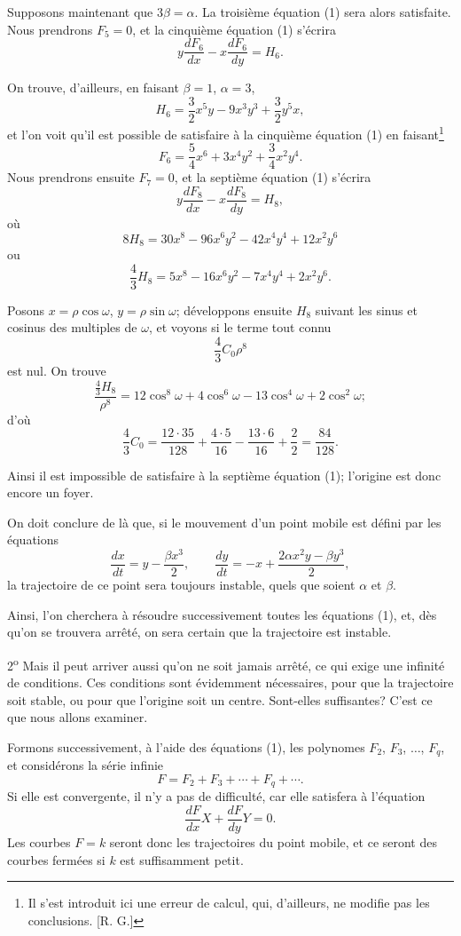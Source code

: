 \documentclass[11pt]{article}
\begin{document}
Supposons maintenant que $3\beta=\alpha$. La troisième équation (1) sera alors satisfaite. Nous prendrons $F_5=0$, et la cinquième équation (1) s’écrira
\[
y\frac{dF_6}{dx}-x\frac{dF_6}{dy}=H_6.
\]

On trouve, d’ailleurs, en faisant $\beta=1$, $\alpha=3$,
\[
H_6=\frac{3}{2}x^5y-9x^3y^3+\frac{3}{2}y^5x,
\]
et l’on voit qu’il est possible de satisfaire à la cinquième équation (1) en faisant\footnote{Il s’est introduit ici une erreur de calcul, qui, d’ailleurs, ne modifie pas les conclusions. [R. G.]}
\[
F_6=\frac{5}{4}x^6+3x^4y^2+\frac{3}{4}x^2y^4.
\]
Nous prendrons ensuite $F_7=0$, et la septième équation (1) s’écrira
\[
y\frac{dF_8}{dx}-x\frac{dF_8}{dy}=H_8,
\]
où
\[
8H_8=30x^8-96x^6y^2-42x^4y^4+12x^2y^6
\]
ou
\[
\frac{4}{3}H_8=5x^8-16x^6y^2-7x^4y^4+2x^2y^6.
\]

Posons $x=\rho\cos\omega$, $y=\rho\sin\omega$; développons ensuite $H_8$ suivant les sinus et cosinus des multiples de $\omega$, et voyons si le terme tout connu
\[
\frac{4}{3}C_0\rho^8
\]
est nul. On trouve
\[
\frac{\frac{4}{3}H_8}{\rho^8}=12\cos^8\omega+4\cos^6\omega-13\cos^4\omega+2\cos^2\omega;
\]
d’où
\[
\frac{4}{3}C_0=\frac{12\cdot35}{128}+\frac{4\cdot5}{16}-\frac{13\cdot6}{16}+\frac{2}{2}=\frac{84}{128}.
\]

Ainsi il est impossible de satisfaire à la septième équation (1); l’origine est donc encore un foyer.

On doit conclure de là que, si le mouvement d’un point mobile est défini par les équations
\[
\frac{dx}{dt}=y-\frac{\beta x^3}{2},
\qquad
\frac{dy}{dt}=-x+\frac{2\alpha x^2y-\beta y^3}{2},
\]
la trajectoire de ce point sera toujours instable, quels que soient $\alpha$ et $\beta$.

Ainsi, l’on cherchera à résoudre successivement toutes les équations (1), et, dès qu’on se trouvera arrêté, on sera certain que la trajectoire est instable.

2\textsuperscript{o} Mais il peut arriver aussi qu’on ne soit jamais arrêté, ce qui exige une infinité de conditions. Ces conditions sont évidemment nécessaires, pour que la trajectoire soit stable, ou pour que l’origine soit un centre. Sont-elles suffisantes? C’est ce que nous allons examiner.

Formons successivement, à l’aide des équations (1), les polynomes $F_2$, $F_3$, $\ldots$, $F_q$, et considérons la série infinie
\[
F=F_2+F_3+\cdots+F_q+\cdots.
\]
Si elle est convergente, il n’y a pas de difficulté, car elle satisfera à l’équation
\[
\frac{dF}{dx}X+\frac{dF}{dy}Y=0.
\]
Les courbes $F=k$ seront donc les trajectoires du point mobile, et ce seront des courbes fermées si $k$ est suffisamment petit.
\end{document}
